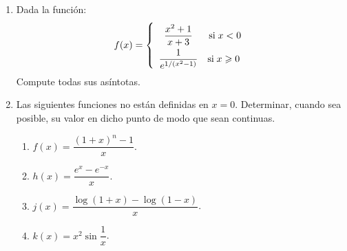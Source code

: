\begin{enumerate}[leftmargin=*]
\item Dada la función:
      \[
      \renewcommand{\arraystretch}{2}
      f(x) = \left\{
      \begin{array}{*{20}c}{
      \dfrac{{x^2  + 1}}{{x + 3}}}     & {\text{si}\;x < 0}           \\
      {\dfrac{1}{{e^{1/(x^2  - 1)} }}} & {\text{si}\;x \geqslant 0\;} \\
      \end{array}
      \right.
      \]
      Compute todas sus asíntotas.

\item  Las siguientes funciones no están definidas en $x=0$.
      Determinar, cuando sea posible, su valor en dicho punto de modo que sean continuas.
      \begin{multicols}{2}
      \begin{enumerate}
      \item  $f(x)=\dfrac{(1+x)^n-1}{x}$.
      \item  $h(x)=\dfrac{e^x-e^{-x}}{x}$.
      \item  $j(x)=\dfrac{\log(1+x)-\log(1-x)}{x}$.
      \item  $k(x)=x^2\sin\dfrac{1}{x}$.
      \end{enumerate}
      \end{multicols}

\end{enumerate}
